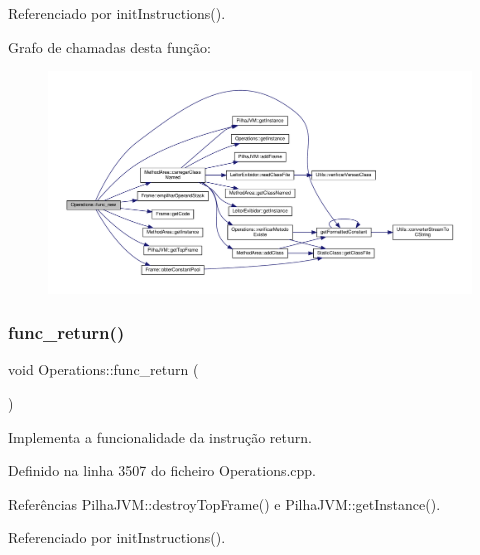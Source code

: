 Referenciado por init\+Instructions().

Grafo de chamadas desta função\+:
\nopagebreak
\begin{figure}[H]
\begin{center}
\leavevmode
\includegraphics[width=350pt]{classOperations_a7594e147407e1f4ede57229899fd17d6_cgraph}
\end{center}
\end{figure}
\mbox{\label{classOperations_aa33b77fb62f7e76c347503c97c6b080b}} 
\subsubsection{\texorpdfstring{func\+\_\+return()}{func\_return()}}
{\footnotesize\ttfamily void Operations\+::func\+\_\+return (\begin{DoxyParamCaption}{ }\end{DoxyParamCaption})\hspace{0.3cm}{\ttfamily [private]}}



Implementa a funcionalidade da instrução return. 



Definido na linha 3507 do ficheiro Operations.\+cpp.



Referências Pilha\+J\+V\+M\+::destroy\+Top\+Frame() e Pilha\+J\+V\+M\+::get\+Instance().



Referenciado por init\+Instructions().

